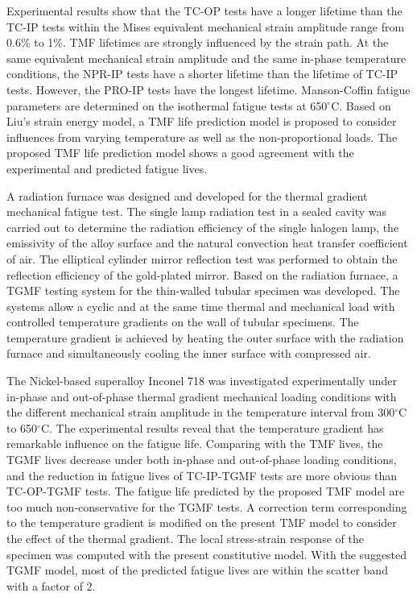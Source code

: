 Experimental results show that the TC-OP tests have a longer lifetime than the TC-IP tests within the Mises equivalent mechanical strain amplitude range from 0.6\% to 1\%.
TMF lifetimes are strongly influenced by the strain path. At the same equivalent mechanical strain amplitude and the same in-phase temperature conditions, the NPR-IP tests have a shorter lifetime than the lifetime of TC-IP tests. However, the PRO-IP tests have the longest lifetime.
Manson-Coffin fatigue parameters are determined on the isothermal fatigue tests at 650$^\circ$C. Based on Liu's strain energy model, a TMF life prediction model is proposed to consider influences from varying temperature as well as the non-proportional loads. The proposed TMF life prediction model shows a good agreement with the experimental and predicted fatigue lives.

A radiation furnace was designed and developed for the thermal gradient mechanical fatigue test. The single lamp radiation test in a sealed cavity was carried out to determine the radiation efficiency of the single halogen lamp, the emissivity of the alloy surface and the natural convection heat transfer coefficient of air. The elliptical cylinder mirror reflection test was performed to obtain the reflection efficiency of the gold-plated mirror. Based on the radiation furnace, a TGMF testing system for the thin-walled tubular specimen was developed. The systems allow a cyclic and at the same time thermal and mechanical load with controlled temperature gradients on the wall of tubular specimens. The temperature gradient is achieved by heating the outer surface with the radiation furnace and simultaneously cooling the inner surface with compressed air. 

The Nickel-based superalloy Inconel 718 was investigated experimentally under in-phase and out-of-phase thermal gradient mechanical loading conditions with the different mechanical strain amplitude in the temperature interval from 300$^\circ$C to 650$^\circ$C. The experimental results reveal that the temperature gradient has remarkable influence on the fatigue life. Comparing with the TMF lives, the TGMF lives decrease under both in-phase and out-of-phase loading conditions, and the reduction in fatigue lives of TC-IP-TGMF tests are more obvious than TC-OP-TGMF tests. The fatigue life predicted by the proposed TMF model are too much non-conservative for the TGMF tests. A correction term corresponding to the temperature gradient is modified on the present TMF model to consider the effect of the thermal gradient. The local stress-strain response of the specimen was computed with the present constitutive model. With the suggested TGMF model, most of the predicted fatigue lives are within the scatter band with a factor of 2.

